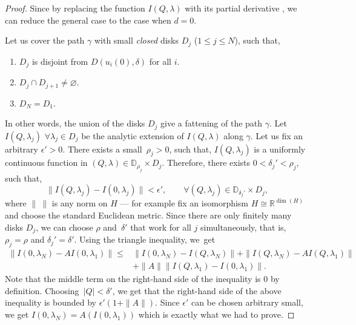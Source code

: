 \documentclass[10pt,a4paper]{article}
\numberwithin{equation}{section}
\newcommand{\RR}{\mathbb{R}}
\begin{document}
\begin{proof}
Since  by replacing the function $I(Q,\lambda)$ with its partial derivative , we can reduce the general case to the case when $d=0$.

Let us cover the path $\gamma$ with small {\em closed} disks $D_j$ ($1\leq j\leq N$), such that,
\begin{enumerate}\itemsep=0pt
\item[(i)]
$D_j$ is disjoint from $D(u_i(0),\delta)$ for all $i$.
\item[(ii)]
$D_j\cap D_{j+1}\neq \varnothing$.
\item[(iii)]
$D_N=D_1$.
\end{enumerate}
In other words, the union of the disks $D_j$ give a fattening of the
path $\gamma$. Let $I(Q,\lambda_j)$ $\forall \lambda_j\in D_j$ be the
analytic extension of $I(Q,\lambda)$ along $\gamma$. Let us fix an
arbitrary $\epsilon'>0$. There exists a small~${\rho_j>0}$, such that,
$I(Q,\lambda_j)$ is a uniformly continuous function in $(Q,\lambda)\in
\mathbb{D}_{\rho_j}\times D_j$. Therefore, there exists $0<\delta_j'<\rho_j$, such that,
\[
\|I(Q,\lambda_j)-I(0,\lambda_j)\|<\epsilon',\qquad \forall
(Q,\lambda_j)\in \mathbb{D}_{\delta_j'}\times D_j,
\]
where $\|\ \|$ is any norm on $H$ --- for example fix an
isomorphism $H\cong \RR^{\operatorname{dim}(H)}$ and choose the
standard Euclidean metric.
Since there are only finitely many disks $D_j$, we can choose $\rho$
and~$\delta'$ that work for all $j$ simultaneously, that is,
$\rho_j=\rho$ and $\delta_j'=\delta'$. Using the triangle inequality,
we~get
\begin{align*}
\| I(0,\lambda_N)-AI(0,\lambda_1)\| \leq{}&
\| I(0,\lambda_N)-I(Q,\lambda_N)\| +
\| I(Q,\lambda_N)-AI(Q,\lambda_1)\|\\
& +
\|A\| \| I(Q,\lambda_1)-I(0,\lambda_1)\|.
\end{align*}
Note that the middle term on the right-hand side of the inequality is $0$ by definition. Choosing~${|Q|<\delta'}$, we get that the right-hand side of the above inequality is bounded by $\epsilon'(1+\|A\|)$. Since $\epsilon'$ can be chosen arbitrary small, we get $I(0,\lambda_N)=A(I(0,\lambda_1))$ which is exactly what we had to prove.
\end{proof}
\end{document}
